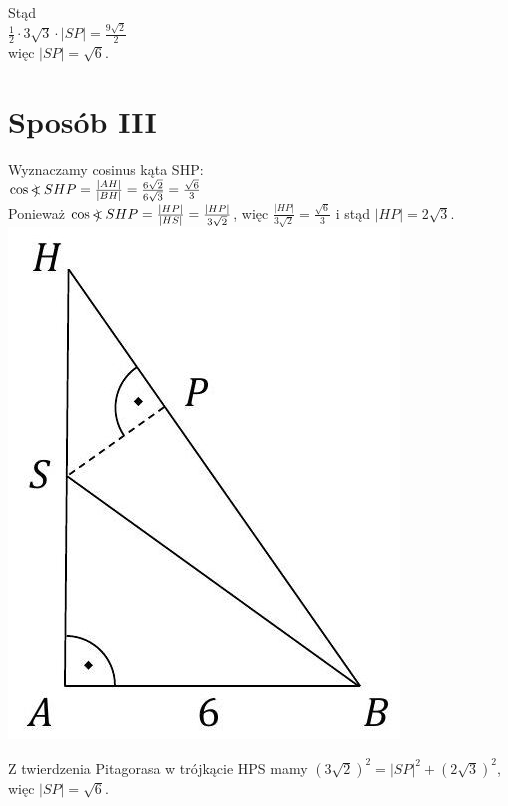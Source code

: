\documentclass[10pt]{article}
\newcommand\Varangle{\mathop{{<\!\!\!\!\!\text{\small)}}\:}\nolimits}
\begin{document}
Stąd\\
$\frac{1}{2} \cdot 3 \sqrt{3} \cdot|S P|=\frac{9 \sqrt{2}}{2}$\\
więc $|S P|=\sqrt{6}$.

\section*{Sposób III}
Wyznaczamy cosinus kąta SHP:\\
$\cos \Varangle S H P=\frac{|A H|}{|B H|}=\frac{6 \sqrt{2}}{6 \sqrt{3}}=\frac{\sqrt{6}}{3}$\\
Ponieważ $\cos \Varangle S H P=\frac{|H P|}{|H S|}=\frac{|H P|}{3 \sqrt{2}}$, więc $\frac{|H P|}{3 \sqrt{2}}=\frac{\sqrt{6}}{3}$ i stąd $|H P|=2 \sqrt{3}$.\\
\includegraphics[max width=\textwidth, center]{2025_02_07_dcb3d059df06a3930b0ag-35(1)}

Z twierdzenia Pitagorasa w trójkącie HPS mamy $(3 \sqrt{2})^{2}=|S P|^{2}+(2 \sqrt{3})^{2}$, więc $|S P|=\sqrt{6}$.
\end{document}
